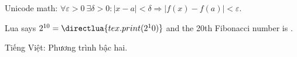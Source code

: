 \documentclass{article}
\begin{document}
Unicode math: $∀ε>0\ ∃δ>0: |x−a|<δ ⇒ |f(x)−f(a)|<ε$.

Lua says $2^{10} = \directlua{tex.print(2^10)}$ and the 20th Fibonacci number is
.

Tiếng Việt: Phương trình bậc hai.
\end{document}
